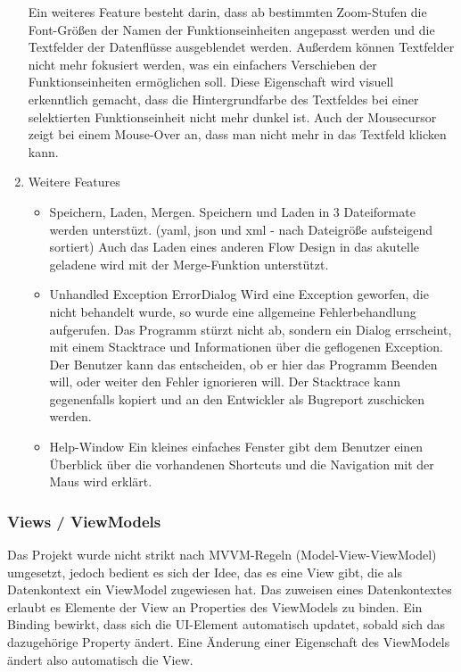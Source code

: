 \documentclass[11pt]{article}
\begin{document}
\begin{enumerate}
Ein weiteres Feature besteht darin, dass ab bestimmten Zoom-Stufen die
Font-Größen der Namen der Funktionseinheiten angepasst werden und die 
Textfelder der Datenflüsse ausgeblendet werden.
Außerdem können Textfelder nicht mehr fokusiert werden, was ein einfachers
Verschieben der Funktionseinheiten ermöglichen soll. Diese Eigenschaft wird
visuell erkenntlich gemacht, dass die Hintergrundfarbe des Textfeldes bei
einer selektierten Funktionseinheit nicht mehr dunkel ist.
Auch der Mousecursor zeigt bei einem Mouse-Over an, dass man nicht mehr in
das Textfeld klicken kann.


\item Weitere Features
\label{sec:orgheadline21}
\begin{itemize}
\item Speichern, Laden, Mergen.
Speichern und Laden in 3 Dateiformate werden unterstüzt.
 (yaml, json und xml - nach Dateigröße aufsteigend sortiert)
 Auch das Laden eines anderen Flow Design in das akutelle geladene wird 
 mit der Merge-Funktion unterstützt.
\end{itemize}


\begin{itemize}
\item Unhandled Exception ErrorDialog
Wird eine Exception geworfen, die nicht behandelt wurde, so wurde eine
allgemeine Fehlerbehandlung aufgerufen. Das Programm stürzt nicht ab,
sondern ein Dialog errscheint, mit einem Stacktrace und Informationen
über die geflogenen Exception. Der Benutzer kann das entscheiden, ob er
hier das Programm Beenden will, oder weiter den Fehler ignorieren will.
Der Stacktrace kann gegenenfalls kopiert und an den Entwickler als
Bugreport zuschicken werden.
\end{itemize}


\begin{itemize}
\item Help-Window
Ein kleines einfaches Fenster gibt dem Benutzer einen Überblick über die
vorhandenen Shortcuts und die Navigation mit der Maus wird erklärt.
\end{itemize}
\end{enumerate}




\subsubsection{Views / ViewModels}
\label{sec:orgheadline23}
Das Projekt wurde nicht strikt nach MVVM-Regeln (Model-View-ViewModel) 
umgesetzt, jedoch bedient es sich der Idee, das es eine View gibt, die
als Datenkontext ein ViewModel zugewiesen hat. Das zuweisen eines
Datenkontextes erlaubt es Elemente der View an Properties des ViewModels zu
binden. Ein Binding bewirkt, dass sich die UI-Element automatisch updatet,
sobald sich das dazugehörige Property ändert. Eine Änderung einer
Eigenschaft des ViewModels ändert also automatisch die View.
\end{document}

